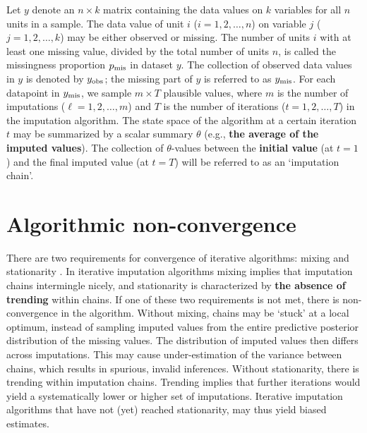\documentclass[Royal,times,sageh]{sagej}
\begin{document}
Let \(y\) denote an \(n \times k\) matrix containing the data values on \(k\) variables for all \(n\) units in a sample. The data value of unit \(i\) (\(i = 1, 2, \dots, n\)) on variable \(j\) (\(j = 1, 2, \dots, k\)) may be either observed or missing. The number of units \(i\) with at least one missing value, divided by the total number of units \(n\), is called the missingness proportion \(p_{\rm mis}\) in dataset \(y\). The collection of observed data values in \(y\) is denoted by \(y_{\rm obs}\); the missing part of \(y\) is referred to as \(y_{\rm mis}\). For each datapoint in \(y_{\rm mis}\), we sample \(m \times T\) plausible values, where \(m\) is the number of imputations (\(\ell = 1, 2, \dots, m\)) and \(T\) is the number of iterations (\(t = 1, 2, \dots, T\)) in the imputation algorithm. The state space of the algorithm at a certain iteration \(t\) may be summarized by a scalar summary \(\theta\) (e.g., \textbf{the average of the imputed values}). The collection of \(\theta\)-values between the \textbf{initial value} (at \(t=1\)) and the final imputed value (at \(t=T\)) will be referred to as an `imputation chain'.

\hypertarget{algorithmic-non-convergence}{%
\section{Algorithmic non-convergence}\label{algorithmic-non-convergence}}

There are two requirements for convergence of iterative algorithms: mixing and stationarity \citep{gelm13}. In iterative imputation algorithms mixing implies that imputation chains intermingle nicely, and stationarity is characterized by \textbf{the absence of trending} within chains. If one of these two requirements is not met, there is non-convergence in the algorithm. Without mixing, chains may be `stuck' at a local optimum, instead of sampling imputed values from the entire predictive posterior distribution of the missing values. The distribution of imputed values then differs across imputations. This may cause under-estimation of the variance between chains, which results in spurious, invalid inferences. Without stationarity, there is trending within imputation chains. Trending implies that further iterations would yield a systematically lower or higher set of imputations. Iterative imputation algorithms that have not (yet) reached stationarity, may thus yield biased estimates.
\end{document}
